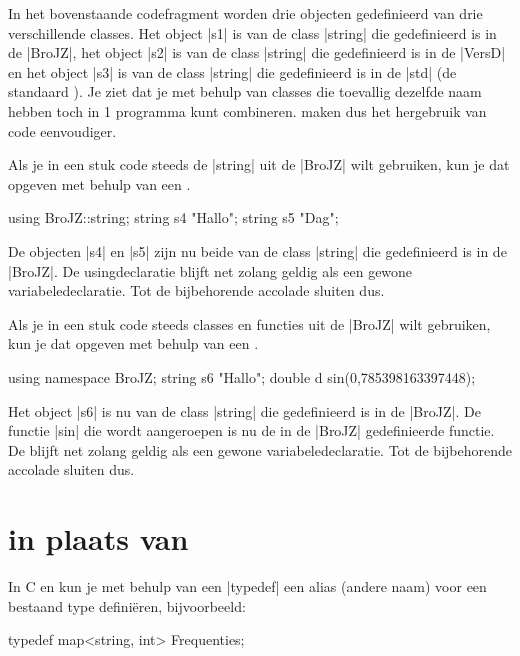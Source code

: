 \begin{cpplstShortInline}
In het bovenstaande codefragment worden drie objecten gedefinieerd van drie verschillende classes.
Het object |s1| is van de class |string| die gedefinieerd is in de  |BroJZ|, het object |s2| is van de class |string| die gedefinieerd is in de  |VersD| en het object |s3| is van de class |string| die gedefinieerd is in de  |std| (de standaard ).
Je ziet dat je met behulp van  classes die toevallig dezelfde naam hebben toch in 1 programma kunt combineren.
 maken dus het hergebruik van code eenvoudiger.

Als je in een stuk code steeds de |string| uit de  |BroJZ| wilt gebruiken, kun je dat opgeven met behulp van een \emph{}.
\begin{cpplstfragment}
	using BroJZ::string;
	string s4 {"Hallo"};
	string s5 {"Dag"};
\end{cpplstfragment}

De objecten |s4| en |s5| zijn nu beide van de class |string| die gedefinieerd is in de  |BroJZ|. 
De usingdeclaratie blijft net zolang geldig als een gewone variabeledeclaratie.
Tot de bijbehorende accolade sluiten dus.

Als je in een stuk code steeds classes en functies uit de  |BroJZ| wilt gebruiken, kun je dat opgeven met behulp van een \emph{}.
\begin{cpplstfragment}
	using namespace BroJZ;
	string s6 {"Hallo"};
	double d {sin(0,785398163397448)};
\end{cpplstfragment}

Het object |s6| is nu van de class |string| die gedefinieerd is in de  |BroJZ|.
De functie |sin| die wordt aangeroepen is nu de in de  |BroJZ| gedefinieerde functie.
De  blijft net zolang geldig als een gewone variabeledeclaratie.
Tot de bijbehorende accolade sluiten dus.

\section[\texttt{using} in plaats van \texttt{typedef}]{\texorpdfstring{}{using} in plaats van \texorpdfstring{}{typedef}}
In C en \Cpp{} kun je met behulp van een |typedef| een alias (andere naam) voor een bestaand type definiëren, bijvoorbeeld:

\begin{cpplstfragment}
typedef map<string, int> Frequenties;
\end{cpplstfragment}


\end{cpplstShortInline}
